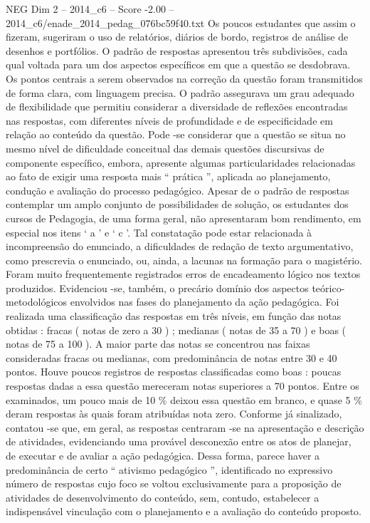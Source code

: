 \begin{textsample}{NEG Dim 2 – 2014\_c6 – Score -2.00 – 2014\_c6/enade\_2014\_pedag\_076bc59f40.txt}
Os poucos estudantes que assim o fizeram, sugeriram o uso de relatórios, diários de bordo, registros de análise de desenhos e portfólios.
O padrão de respostas apresentou três subdivisões, cada qual voltada para um dos aspectos específicos em que a questão se desdobrava.
Os pontos centrais a serem observados na correção da questão foram transmitidos de forma clara, com linguagem precisa.
O padrão assegurava um grau adequado de flexibilidade que permitiu considerar a diversidade de reflexões encontradas nas respostas, com diferentes níveis de profundidade e de especificidade em relação ao conteúdo da questão.
Pode -se considerar que a questão se situa no mesmo nível de dificuldade conceitual das demais questões discursivas de componente específico, embora, apresente algumas particularidades relacionadas ao fato de exigir uma resposta mais “ prática ”, aplicada ao planejamento, condução e avaliação do processo pedagógico.
Apesar de o padrão de respostas contemplar um amplo conjunto de possibilidades de solução, os estudantes dos cursos de Pedagogia, de uma forma geral, não apresentaram bom rendimento, em especial nos itens ‘ a ’ e ‘ c ’.
Tal constatação pode estar relacionada à incompreensão do enunciado, a dificuldades de redação de texto argumentativo, como prescrevia o enunciado, ou, ainda, a lacunas na formação para o magistério.
Foram muito frequentemente registrados erros de encadeamento lógico nos textos produzidos.
Evidenciou -se, também, o precário domínio dos aspectos teórico-metodológicos envolvidos nas fases do planejamento da ação pedagógica.
Foi realizada uma classificação das respostas em três níveis, em função das notas obtidas : fracas ( notas de zero a 30 ) ; medianas ( notas de 35 a 70 ) e boas ( notas de 75 a 100 ).
A maior parte das notas se concentrou nas faixas consideradas fracas ou medianas, com predominância de notas entre 30 e 40 pontos.
Houve poucos registros de respostas classificadas como boas : poucas respostas dadas a essa questão mereceram notas superiores a 70 pontos.
Entre os examinados, um pouco mais de 10 \% deixou essa questão em branco, e quase 5 \% deram respostas às quais foram atribuídas nota zero.
Conforme já sinalizado, contatou -se que, em geral, as respostas centraram -se na apresentação e descrição de atividades, evidenciando uma provável desconexão entre os atos de planejar, de executar e de avaliar a ação pedagógica.
Dessa forma, parece haver a predominância de certo “ ativismo pedagógico ”, identificado no expressivo número de respostas cujo foco se voltou exclusivamente para a proposição de atividades de desenvolvimento do conteúdo, sem, contudo, estabelecer a indispensável vinculação com o planejamento e a avaliação do conteúdo proposto.

\end{textsample}

